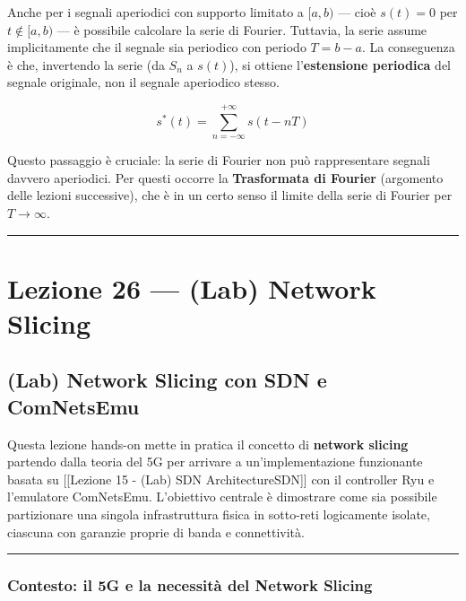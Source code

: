 \documentclass[
  italian,
  openany]{book}
\begin{document}
Anche per i segnali aperiodici con supporto limitato a \([a, b)\) ---
cioè \(s(t) = 0\) per \(t \notin [a,b)\) --- è possibile calcolare la
serie di Fourier. Tuttavia, la serie assume implicitamente che il
segnale sia periodico con periodo \(T = b - a\). La conseguenza è che,
invertendo la serie (da \(S_n\) a \(s(t)\)), si ottiene
l'\textbf{estensione periodica} del segnale originale, non il segnale
aperiodico stesso.

\[s^*(t) = \sum_{n=-\infty}^{+\infty} s(t - nT)\]

Questo passaggio è cruciale: la serie di Fourier non può rappresentare
segnali davvero aperiodici. Per questi occorre la \textbf{Trasformata di
Fourier} (argomento delle lezioni successive), che è in un certo senso
il limite della serie di Fourier per \(T \to \infty\).

\begin{center}\rule{0.5\linewidth}{0.5pt}\end{center}

\newpage

\chapter{Lezione 26 --- (Lab) Network
Slicing}\label{lezione-26-lab-network-slicing}

\section{(Lab) Network Slicing con SDN e
ComNetsEmu}\label{lab-network-slicing-con-sdn-e-comnetsemu}

Questa lezione hands-on mette in pratica il concetto di \textbf{network
slicing} partendo dalla teoria del 5G per arrivare a un'implementazione
funzionante basata su {[}{[}Lezione 15 - (Lab) SDN
Architecture\textbar SDN{]}{]} con il controller Ryu e l'emulatore
ComNetsEmu. L'obiettivo centrale è dimostrare come sia possibile
partizionare una singola infrastruttura fisica in sotto-reti logicamente
isolate, ciascuna con garanzie proprie di banda e connettività.

\begin{center}\rule{0.5\linewidth}{0.5pt}\end{center}

\subsection{Contesto: il 5G e la necessità del Network
Slicing}\label{contesto-il-5g-e-la-necessituxe0-del-network-slicing}
\end{document}
